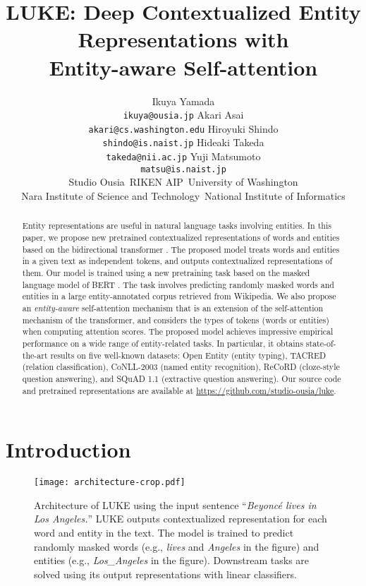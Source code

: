 \documentclass[11pt,a4paper]{article}
\title{LUKE: Deep Contextualized Entity Representations with\\ Entity-aware Self-attention}
\author{
    Ikuya Yamada\\
    {\small \texttt{ikuya@ousia.jp}}
    \And
    Akari Asai\\
    {\small \texttt{akari@cs.washington.edu}}
    \And
    Hiroyuki Shindo\\
    {\small \texttt{shindo@is.naist.jp}}
    \AND
    Hideaki Takeda\\
    {\small \texttt{takeda@nii.ac.jp}}
    \And
    Yuji Matsumoto\\
    {\small \texttt{matsu@is.naist.jp}}
    \AND
    \begin{minipage}{\textwidth}
        \begin{center}
            \fontsize{11.5}{14}\selectfont
            \textnormal{Studio Ousia\,\,\,RIKEN AIP\,\,\,University of Washington}\\
            \textnormal{Nara Institute of Science and Technology\,\,\,National Institute of Informatics} \end{center}
    \end{minipage}
}
\date{}
\begin{document}
\maketitle
\begin{abstract}
    Entity representations are useful in natural language tasks involving entities.
    In this paper, we propose new pretrained contextualized representations of words and entities based on the bidirectional transformer \cite{NIPS2017_7181}.
    The proposed model treats words and entities in a given text as independent tokens, and outputs contextualized representations of them.
    Our model is trained using a new pretraining task based on the masked language model of BERT \cite{devlin2018bert}.
    The task involves predicting randomly masked words and entities in a large entity-annotated corpus retrieved from Wikipedia.
    We also propose an \textit{entity-aware} self-attention mechanism that is an extension of the self-attention mechanism of the transformer, and considers the types of tokens (words or entities) when computing attention scores.
    The proposed model achieves impressive empirical performance on a wide range of entity-related tasks.
    In particular, it obtains state-of-the-art results on five well-known datasets: Open Entity (entity typing), TACRED (relation classification), CoNLL-2003 (named entity recognition), ReCoRD (cloze-style question answering), and SQuAD 1.1 (extractive question answering).
    Our source code and pretrained representations are available at \url{https://github.com/studio-ousia/luke}.
\end{abstract}

\section{Introduction}

\label{sec:introduction}

\begin{figure*}[t]
    \centering
    \texttt{[image: architecture-crop.pdf]}
    \caption{Architecture of LUKE using the input sentence ``\textit{Beyoncé lives in Los Angeles.}''
        LUKE outputs contextualized representation for each word and entity in the text.
        The model is trained to predict randomly masked words (e.g., \textit{lives} and \textit{Angeles} in the figure) and entities (e.g., \textit{Los\_Angeles} in the figure).
        Downstream tasks are solved using its output representations with linear classifiers.}
    \label{fig:architecture}
\end{figure*}
\end{document}
